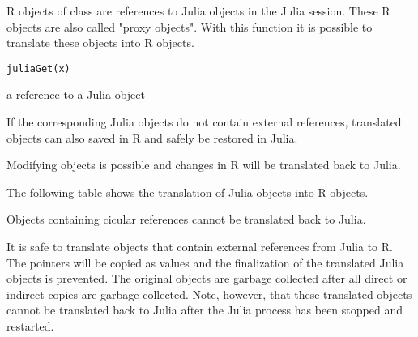 %
\begin{Description}\relax
R objects of class  are references to Julia objects in the Julia session.
These R objects are also called "proxy objects".
With this function it is possible to translate these objects into R objects.
\end{Description}
%
\begin{Usage}
\begin{verbatim}
juliaGet(x)
\end{verbatim}
\end{Usage}
%
\begin{Arguments}
\begin{ldescription}
\item[\code{x}] a reference to a Julia object
\end{ldescription}
\end{Arguments}
%
\begin{Details}\relax
If the corresponding Julia objects do not contain external references,
translated objects can also saved in R and safely be restored in Julia.

Modifying objects is possible and changes in R will be translated back to Julia.

The following table shows the translation of Julia objects into R objects.


\end{Details}
%
\begin{Note}\relax
Objects containing cicular references cannot be translated back to Julia.

It is safe to translate objects that contain external references from Julia to R.
The pointers will be copied as values and the finalization of the translated
Julia objects is prevented.
The original objects are garbage collected after all direct or
indirect copies are garbage collected.
Note, however, that these translated objects cannot be translated back to Julia
after the Julia process has been stopped and restarted.
\end{Note}
